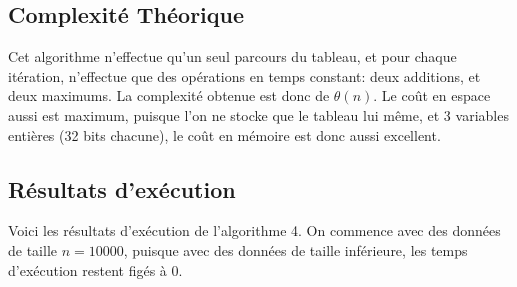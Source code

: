 \documentclass[a4paper, 12pt]{article}
\begin{document}
\subsection{Complexité Théorique}
Cet algorithme n'effectue qu'un seul parcours du tableau, et pour chaque itération, n'effectue que des opérations en temps constant: deux additions, et deux maximums. 
La complexité obtenue est donc de $\theta(n)$. Le coût en espace aussi est maximum, puisque l'on ne stocke que le tableau lui même, et 3 variables entières (32 bits chacune), le coût en mémoire est donc aussi excellent.  
\subsection{Résultats d’exécution}
Voici les résultats d'exécution de l'algorithme 4. On commence avec des données de taille $n=10000$, puisque avec des données de taille inférieure, les temps d'exécution restent figés à 0. 
\end{document}
